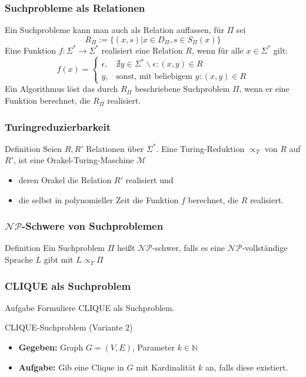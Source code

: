 \documentclass{beamer}
\begin{document}
{\begin{frame}
\frametitle{Suchprobleme als Relationen}
Ein Suchprobleme kann man auch als Relation auffassen, für $\Pi$ sei
$$ R_\Pi := \{ (x,s) | x \in D_\Pi, s\in S_\Pi(x)\}$$
Eine Funktion $f: \Sigma^* \rightarrow \Sigma^*$ realisiert eine Relation $R$, wenn für alle $x \in \Sigma^*$ gilt:
$$f(x) = \begin{cases}
\epsilon, & \nexists y \in \Sigma^*\backslash\epsilon : (x,y) \in R\\
y, & \mbox{sonst, mit beliebigem }y:(x,y) \in R
\end{cases}$$
Ein Algorithmus löst das durch $R_\Pi$ beschriebene Suchproblem $\Pi$, wenn er eine Funktion berechnet, die $R_\Pi$ realisiert.
\end{frame}

\begin{frame}
\frametitle{Turingreduzierbarkeit}
\begin{block}{Definition}
Seien $R, R'$ Relationen über $\Sigma^*$. Eine Turing-Reduktion $\propto_T$ von $R$ auf $R'$, ist eine Orakel-Turing-Maschine $\mathcal{M}$
\begin{itemize}
\item deren Orakel die Relation $R'$ realisiert und
\item die selbst in polynomieller Zeit die Funktion $f$ berechnet, die $R$ realisiert. 
\end{itemize}
\end{block}
\end{frame}

\begin{frame}
 \frametitle{$\mathcal{NP}$-Schwere von Suchproblemen}
 \begin{block}{Definition}
  Ein Suchproblem $\Pi$ heißt $\mathcal{NP}$-schwer, falls es eine $\mathcal{NP}$-vollständige Sprache $L$ gibt mit $L \propto_T \Pi$
 \end{block}
\end{frame}

\begin{frame}
 \frametitle{CLIQUE als Suchproblem}
 \begin{block}{Aufgabe}
  Formuliere CLIQUE als Suchproblem.
 \end{block}
 \pause
 \begin{block}{CLIQUE-Suchproblem (Variante 2)}
  \begin{itemize}
   \item \textbf{Gegeben: } Graph $G = (V,E)$, Parameter $k\in \mathbb{N}$
   \item \textbf{Aufgabe: } Gib eine Clique in $G$ mit Kardinalität $k$ an, falls diese existiert.
  \end{itemize}
 \end{block}
 \end{frame}
 
}
\end{document}

